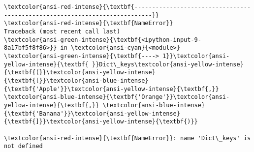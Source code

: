 \documentclass[11pt]{article}
\makeatletter
\newcommand{\boxspacing}{\kern\kvtcb@left@rule\kern\kvtcb@boxsep}
\newcommand{\prompt}[4]{
        {\ttfamily\llap{{\color{#2}[#3]:\hspace{3pt}#4}}\vspace{-\baselineskip}}
    }
\makeatother
\begin{document}
    \begin{tcolorbox}[breakable, size=fbox, boxrule=1pt, pad at break*=1mm,colback=cellbackground, colframe=cellborder]
\prompt{In}{incolor}{9}{\boxspacing}
\begin{Verbatim}[commandchars=\\\{\}]

\end{Verbatim}
\end{tcolorbox}

    \begin{Verbatim}[commandchars=\\\{\}, frame=single, framerule=2mm, rulecolor=\color{outerrorbackground}]
\textcolor{ansi-red-intense}{\textbf{---------------------------------------------------------------------------}}
\textcolor{ansi-red-intense}{\textbf{NameError}}                                 Traceback (most recent call last)
\textcolor{ansi-green-intense}{\textbf{<ipython-input-9-8a17bf5f8f86>}} in \textcolor{ansi-cyan}{<module>}
\textcolor{ansi-green-intense}{\textbf{----> 1}}\textcolor{ansi-yellow-intense}{\textbf{ }}Dict\_keys\textcolor{ansi-yellow-intense}{\textbf{(}}\textcolor{ansi-yellow-intense}{\textbf{[}}\textcolor{ansi-blue-intense}{\textbf{'Apple'}}\textcolor{ansi-yellow-intense}{\textbf{,}} \textcolor{ansi-blue-intense}{\textbf{'Orange'}}\textcolor{ansi-yellow-intense}{\textbf{,}} \textcolor{ansi-blue-intense}{\textbf{'Banana'}}\textcolor{ansi-yellow-intense}{\textbf{]}}\textcolor{ansi-yellow-intense}{\textbf{)}}

\textcolor{ansi-red-intense}{\textbf{NameError}}: name 'Dict\_keys' is not defined
    \end{Verbatim}

    \begin{tcolorbox}[breakable, size=fbox, boxrule=1pt, pad at break*=1mm,colback=cellbackground, colframe=cellborder]
\prompt{In}{incolor}{ }{\boxspacing}
\begin{Verbatim}[commandchars=\\\{\}]

\end{Verbatim}
\end{tcolorbox}

    \begin{tcolorbox}[breakable, size=fbox, boxrule=1pt, pad at break*=1mm,colback=cellbackground, colframe=cellborder]
\prompt{In}{incolor}{ }{\boxspacing}
\begin{Verbatim}[commandchars=\\\{\}]

\end{Verbatim}
\end{tcolorbox}
\end{document}
